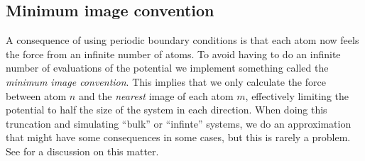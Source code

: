 
\subsection{Minimum image convention}
A consequence of using periodic boundary conditions is that each atom now feels the force from an infinite number of atoms. To avoid having to do an infinite number of evaluations of the potential we implement something called the \emph{minimum image convention}. This implies that we only calculate the force between atom $n$ and the \emph{nearest} image of each atom $m$, effectively limiting the potential to half the size of the system in each direction. When doing this truncation and simulating ``bulk'' or ``infinte'' systems, we do an approximation that might have some consequences in some cases, but this is rarely a problem. See \cite[Section 1.5]{allen1989computer} for a discussion on this matter.

